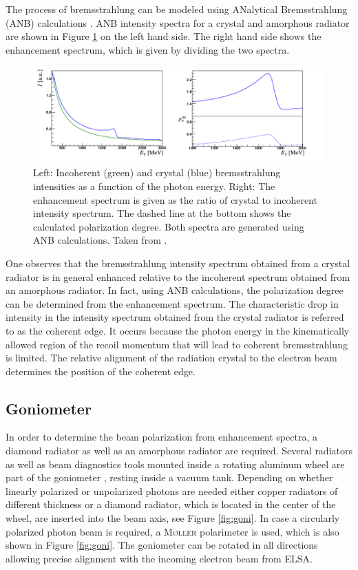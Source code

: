 The process of bremsstrahlung can be modeled using ANalytical Bremsstrahlung (ANB) calculations \cite{anb}. ANB intensity spectra for a crystal and amorphous radiator are shown in Figure \ref{fig:anb} on the left hand side. The right hand side shows the enhancement spectrum, which is given by dividing the two spectra. 
\begin{figure}[htbp]
	\centering
	\includegraphics[width=\linewidth]{figs/anb.pdf}
	\caption{Left: Incoherent (green) and crystal (blue) bremsstrahlung intensities as a function of the photon energy. Right: The enhancement spectrum is given as the ratio of crystal to incoherent intensity spectrum. The dashed line at the bottom shows the calculated polarization degree. Both spectra are generated using ANB calculations. Taken from \cite{farahphd}.}
	\label{fig:anb}
\end{figure} 
One observes that the bremsstrahlung intensity spectrum obtained from a crystal radiator is in general enhanced relative to the incoherent spectrum obtained from an amorphous radiator. In fact, using ANB calculations, the polarization degree can be determined from the enhancement spectrum. The characteristic drop in intensity in the intensity spectrum obtained from the crystal radiator is referred to as the coherent edge. It occurs because the photon energy in the kinematically allowed region of the recoil momentum that will lead to coherent bremsstrahlung is limited. The relative alignment of the radiation crystal to the electron beam determines the position of the coherent edge. 
\subsection{Goniometer}
In order to determine the beam polarization from enhancement spectra, a diamond radiator as well as an amorphous radiator are required. Several radiators as well as beam diagnostics tools mounted inside a rotating aluminum wheel are part of the goniometer \cite{goni}, resting inside a vacuum tank. Depending on whether linearly polarized or unpolarized photons are needed either copper radiators of different thickness or a diamond radiator, which is located in the center of the wheel, are inserted into the beam axis, see Figure \ref{fig:goni}. In case a circularly polarized photon beam is required, a \textsc{M\o ller} polarimeter \cite{moller} is used, which is also shown in Figure \ref{fig:goni}. The goniometer can be rotated in all directions allowing precise alignment with the incoming electron beam from ELSA.  
\label{subsec:goni}


